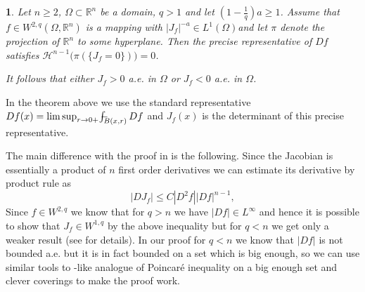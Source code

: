\documentclass[12pt,a4paper]{amsart}
\theoremstyle{plain}
\newtheorem{proclaim}[thm]{\the\prt}
\theoremstyle{definition}
\numberwithin{equation}{section}
\def\er{\mathbb R}
\def\oint{-\hskip -11pt \int}
\def\rn{\mathbb R^n}
\def\haus{\mathcal{H}}
\begin{document}
\begin{proclaim}\label{technical}
Let  $n\geq 2$, $\Omega\subset\er^n$ be a domain, $q> 1$ %
and let $(1-\frac{1}{q})a\geq 1$. 
Assume that $f\in W^{2,q}(\Omega,\er^n)$ is a mapping with $|J_f|^{-a}\in L^1(\Omega)$and let $\pi$ denote the projection of $\rn$ to some hyperplane. Then the precise representative of $Df$ satisfies $\haus^{n-1}\bigl(\pi(\{J_f=0\})\bigr)=0$. 

It follows that either $J_f>0$ a.e. in $\Omega$ or $J_f<0$ a.e. in $\Omega$. 

\end{proclaim}

In the theorem above we use the standard representative $Df(x)=\limsup_{r\to 0+}\oint_{B(x,r)} Df$ and $J_f(x)$ is the determinant of this precise representative.%


The main difference with the proof in \cite{CHMS} is the following. Since the Jacobian is essentially a product of $n$ first order derivatives we can estimate its derivative by product rule as  
$$
|DJ_f|\leq C |D^2f| |Df|^{n-1},
$$
Since $f\in W^{2,q}$ we know that for $q>n$ we have $|Df|\in L^{\infty}$ and hence it is possible to show that $J_f\in W^{1,q}$ by the above inequality but for $q<n$ we get only a weaker result (see \cite[Lemma 2.2]{CHMS} for details). In our proof for $q<n$ we know that $|Df|$ is not bounded a.e. but it is in fact bounded on a set which is big enough, so we can use similar tools to \cite{CHMS}-like analogue of Poincar\'e inequality on a big enough set and clever coverings to make the proof work. 


\end{document}
